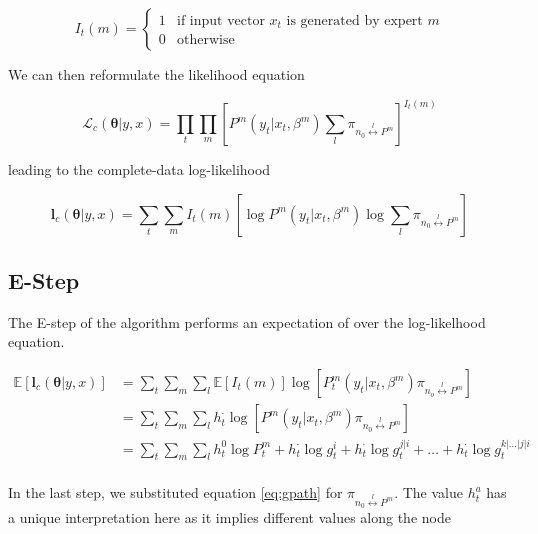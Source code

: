 \documentclass[12pt]{article}
\begin{document}
\begin{equation} \label{eq:indicator}
  I_{t}(m) = \begin{cases} 
     1 & \textrm{if input vector $x_{t}$ is generated by expert $m$} \\
     0 & \textrm{otherwise}
             \end{cases}
\end{equation}

We can then reformulate the likelihood equation

\begin{equation}  \label{eq:likelihood2}
  \mathcal{L}_{c}(\boldsymbol{\theta}|y,x) = \prod_{t}\prod_{m}[P^{m}(y_{t}|x_{t},\beta^{m})\sum_{l}\pi_{n_{0}\overset{l}{\longleftrightarrow} P^{m}}]^{I_{t}(m)}
\end{equation}

leading to the complete-data log-likelihood

\begin{equation}  \label{eq:loglikelihood2}
  \boldsymbol{l}_{c}(\boldsymbol{\theta}|y,x) = \sum_{t}\sum_{m}I_{t}(m)[\log P^{m}(y_{t}|x_{t},\beta^{m}) \log\sum_{l}\pi_{n_{0}\overset{l}{\longleftrightarrow} P^{m}}]
\end{equation}

\subsection{E-Step}
The E-step of the algorithm performs an expectation of over the log-likelhood
equation.

\begin{equation} \label{eq:Estep}
  \begin{split}
  \mathbb{E}\left[\boldsymbol{l}_{c}(\boldsymbol{\theta}|y,x)\right] & = \sum_{t}\sum_{m}\sum_{l}\mathbb{E}\left[I_{t}(m)\right]\log[P^{m}_{t}(y_{t}|x_{t},\beta^{m})\pi_{n_{o}\overset{l}{\longleftrightarrow} P^{m}}] \\
   & = \sum_{t}\sum_{m}\sum_{l}h^{\cdotp}_{t}\log[P^{m}(y_{t}|x_{t},\beta^{m})\pi_{n_{0}\overset{l}{\longleftrightarrow} P^{m}}] \\
   & = \sum_{t}\sum_{m}\sum_{l}h^{0}_{t}\log P^{m}_{t} + h^{\cdotp}_{t} \log g^{i}_{t} + h^{\cdotp}_{t} \log g^{j|i}_{t} + \ldots + h^{\cdotp}_{t} \log g^{k|\dots|j|i}_{t} \\
  \end{split}
\end{equation}

In the last step, we substituted equation \ref{eq:gpath} for
$\pi_{n_{0}\overset{l}{\longleftrightarrow} P^{m}}$. The value $h_{t}^{a}$
has a unique interpretation here as it implies different values along the
node
\end{document}
